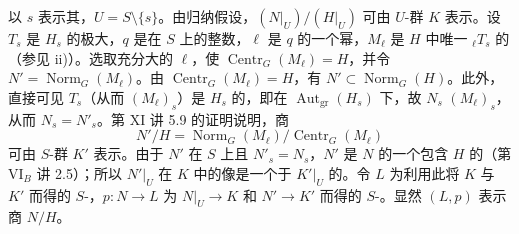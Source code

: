以 $s$ 表示其，$U=S\setminus\{s\}$。由归纳假设，$(N|_U)/(H|_U)$ 可由 $U$-群 $K$ 表示。设 $T_s$ 是 $H_s$ 的极大，$q$ 是在 $S$ 上的整数，$\ell$ 是 $q$ 的一个幂，$M_\ell$ 是 $H$ 中唯一 ${}_\ell T_s$ 的（参见 ii)）。选取充分大的 $\ell$，使 $\operatorname{Centr}_G(M_\ell)=H$，并令 $N'=\operatorname{Norm}_G(M_\ell)$。由 $\operatorname{Centr}_G(M_\ell)=H$，有 $N'\subset\operatorname{Norm}_G(H)$。此外，直接可见 $T_s$（从而 $(M_\ell)_s$）是 $H_s$ 的，即在 $\operatorname{Aut}_{\mathrm{gr}}(H_s)$ 下，故 $N_s$  $(M_\ell)_s$，从而 $N_s=N'_s$。第 XI 讲 5.9 的证明说明，商
\[N'/H=\operatorname{Norm}_G(M_\ell)/\operatorname{Centr}_G(M_\ell)\]
可由 $S$-群 $K'$ 表示。由于 $N'$ 在 $S$ 上且 $N'_s=N_s$，$N'$ 是 $N$ 的一个包含 $H$ 的（第 VI$_B$ 讲 2.5）；所以 $N'|_U$ 在 $K$ 中的像是一个于 $K'|_U$ 的。令 $L$ 为利用此将 $K$ 与 $K'$ 而得的 $S$-，$p:N\to L$ 为 $N|_U\to K$ 和 $N'\to K'$ 而得的 $S$-。显然 $(L,p)$ 表示商 $N/H$。

